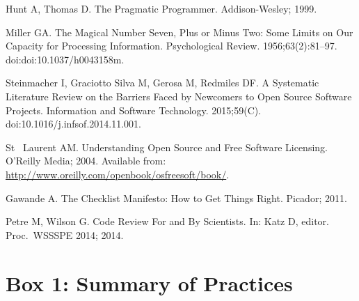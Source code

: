 \documentclass[10pt,letterpaper]{article}
\begin{document}
\begin{thebibliography}{10}
Hunt A, Thomas D.
\newblock The Pragmatic Programmer.
\newblock Addison-Wesley; 1999.

Miller GA.
\newblock The Magical Number Seven, Plus or Minus Two: Some Limits on Our
  Capacity for Processing Information.
\newblock Psychological Review. 1956;63(2):81–97.
\newblock doi:{doi:10.1037/h0043158m}.

Steinmacher I, {Graciotto Silva} M, Gerosa M, Redmiles DF.
\newblock A Systematic Literature Review on the Barriers Faced by Newcomers to
  Open Source Software Projects.
\newblock Information and Software Technology. 2015;59(C).
\newblock doi:{10.1016/j.infsof.2014.11.001}.

{St ~Laurent} AM.
\newblock Understanding Open Source and Free Software Licensing.
\newblock O'Reilly Media; 2004.
\newblock Available from:
  \url{http://www.oreilly.com/openbook/osfreesoft/book/}.

Gawande A.
\newblock The Checklist Manifesto: How to Get Things Right.
\newblock Picador; 2011.

Petre M, Wilson G.
\newblock Code Review For and By Scientists.
\newblock In: Katz D, editor. Proc.\ WSSSPE 2014; 2014.

\end{thebibliography}

\pagebreak

\section*{Box 1: Summary of Practices}
\end{document}
